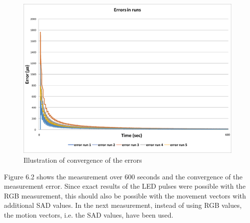 \documentclass[12pt, a4paper]{report}
\begin{document}
    \begin{figure}[H]
      \includegraphics[scale=0.5]{Images/errors_600sec.png}
  
    \caption{Illustration of convergence of the errors}
    \end{figure}

    Figure 6.2 shows the measurement over 600 seconds and the convergence of the measurement error.
    Since exact results of the LED pulses were possible with the RGB measurement, this should also be possible with the movement vectors with additional SAD values.
    In the next measurement, instead of using RGB values, the motion vectors, i.e. the SAD values, have been used.
\end{document}
